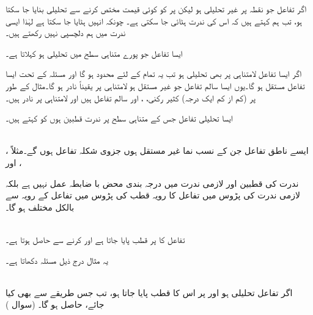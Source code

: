اگر تفاعل  جو نقطہ  پر غیر تحلیلی ہو لیکن  پر  کو کوئی قیمت مختص کرنے سے تحلیلی بنایا جا سکتا ہو، تب ہم کہتے ہیں کہ اس کی ندرت ہٹائی جا سکتی ہے۔ چونکہ انہیں ہٹایا جا سکتا ہے لہٰذا ایسی ندرت میں ہم دلچسپی نہیں رکھتے ہیں۔

ایسا تفاعل جو پورے متناہی سطح میں تحلیلی ہو  کہلاتا ہے۔

اگر ایسا تفاعل لامتناہی پر بھی تحلیلی ہو تب یہ تمام  کے لئے محدود ہو گا اور مسئلہ  کے تحت ایسا تفاعل مستقل ہو گا۔یوں ایسا سالم تفاعل جو غیر مستقل ہو لامتناہی پر یقیناً  نادر ہو گا۔مثال کے طور پر (کم از کم ایک درجہ) کثیر رکنی، ،  اور  سالم تفاعل ہیں اور لامتناہی پر نادر ہیں۔

ایسا تحلیلی تفاعل جس کے متناہی سطح پر ندرت قطبین ہوں کو  کہتے ہیں۔

\quad {}\\
ایسے ناطق تفاعل جن  کے نسب نما غیر مستقل ہوں جزوی شکلہ تفاعل ہوں گے۔مثلاً ، ،  اور   

ندرت کی قطبین اور لازمی ندرت میں درجہ بندی محض با ضابطہ عمل نہیں ہے بلکہ لازمی ندرت کی پڑوس میں تفاعل کا رویہ قطب کی پڑوس میں تفاعل کے رویہ سے بالکل مختلف ہو گا۔

\quad {}\\
تفاعل  کا  پر قطب پایا جاتا ہے اور  کرنے سے  حاصل ہوتا ہے۔

یہ مثال درج ذیل مسئلہ  دکھاتا ہے۔

\quad {}\\
اگر تفاعل  تحلیلی ہو اور  پر  اس کا قطب  پایا جاتا ہو، تب جس طریقے سے بھی  کیا جائے،  حاصل ہو گا۔ (سوال ) 

